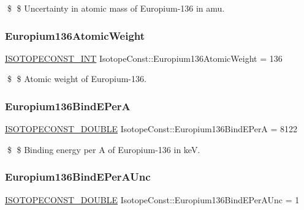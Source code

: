 \$ \$ Uncertainty in atomic mass of Europium-\/136 in amu. \mbox{\label{group___isotope_const-_europium-_eu136_gab6b60dc62aead9ec25b2027eca1c45e3}} 
\subsubsection{\texorpdfstring{Europium136\+Atomic\+Weight}{Europium136AtomicWeight}}
{\footnotesize\ttfamily \mbox{\hyperlink{group___isotope_const-_macros_ga5f18360b3e99483a35c32d789e62621c}{I\+S\+O\+T\+O\+P\+E\+C\+O\+N\+S\+T\+\_\+\+I\+NT}} Isotope\+Const\+::\+Europium136\+Atomic\+Weight = 136}

\$ \$ Atomic weight of Europium-\/136. \mbox{\label{group___isotope_const-_europium-_eu136_ga3cc269f6b724daa4601eac8b52dcfcba}} 
\subsubsection{\texorpdfstring{Europium136\+Bind\+E\+PerA}{Europium136BindEPerA}}
{\footnotesize\ttfamily \mbox{\hyperlink{group___isotope_const-_macros_ga8f45a7272ce02c0b4c65c44636ed719a}{I\+S\+O\+T\+O\+P\+E\+C\+O\+N\+S\+T\+\_\+\+D\+O\+U\+B\+LE}} Isotope\+Const\+::\+Europium136\+Bind\+E\+PerA = 8122}

\$ \$ Binding energy per A of Europium-\/136 in keV. \mbox{\label{group___isotope_const-_europium-_eu136_gaf2ebfebc94dbc5ebfe7b82ec2cfedcaa}} 
\subsubsection{\texorpdfstring{Europium136\+Bind\+E\+Per\+A\+Unc}{Europium136BindEPerAUnc}}
{\footnotesize\ttfamily \mbox{\hyperlink{group___isotope_const-_macros_ga8f45a7272ce02c0b4c65c44636ed719a}{I\+S\+O\+T\+O\+P\+E\+C\+O\+N\+S\+T\+\_\+\+D\+O\+U\+B\+LE}} Isotope\+Const\+::\+Europium136\+Bind\+E\+Per\+A\+Unc = 1}


